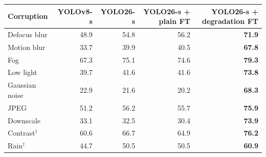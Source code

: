 \begin{tabular}{lrrrr}
\toprule
Corruption & YOLOv8-s & YOLO26-s & YOLO26-s + plain FT & YOLO26-s + degradation FT \\
\midrule
Defocus blur & 48.9 & 54.8 & 56.2 & \textbf{71.9} \\
Motion blur & 33.7 & 39.9 & 40.5 & \textbf{67.8} \\
Fog & 67.3 & 75.1 & 74.6 & \textbf{79.3} \\
Low light & 39.7 & 41.6 & 41.6 & \textbf{73.8} \\
Gaussian noise & 22.9 & 21.6 & 20.2 & \textbf{68.3} \\
JPEG & 51.2 & 56.2 & 55.7 & \textbf{75.9} \\
Downscale & 33.1 & 32.5 & 30.4 & \textbf{73.9} \\
Contrast$^{\dagger}$ & 60.6 & 66.7 & 64.9 & \textbf{76.2} \\
Rain$^{\dagger}$ & 44.7 & 50.5 & 50.5 & \textbf{60.9} \\
\bottomrule
\end{tabular}
